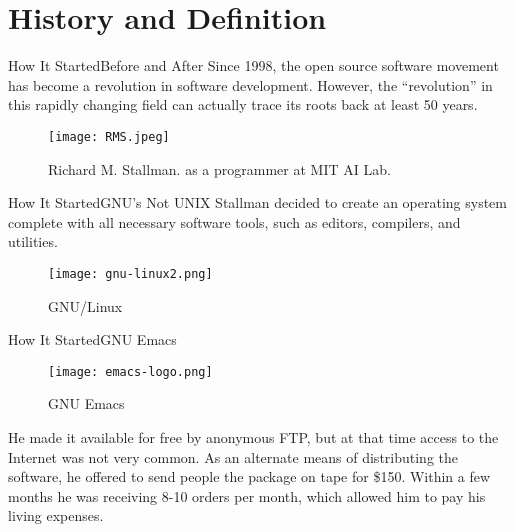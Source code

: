 \documentclass{beamer}
\begin{document}
    \section{History and Definition}
    \begin{frame}{How It Started}{Before and After}
        Since 1998, the open source software movement has become a revolution in software development.
        However, the “revolution” in this rapidly changing field can actually trace its roots back at least 50 years.\cite{bretthauer2001open}
        \begin{figure}
            \centering
                \texttt{[image: RMS.jpeg]}
                \caption{Richard M. Stallman. as a programmer at MIT AI Lab.\cite{GNUDOTORG:2}}
        \end{figure}
    \end{frame}

    \begin{frame}{How It Started}{GNU's Not UNIX}
        Stallman decided to create an operating system complete with all necessary software tools, such as
        editors, compilers, and utilities.\cite{bretthauer2001open}
        \begin{figure}
            \centering
                \texttt{[image: gnu-linux2.png]}
                \caption{GNU/Linux \cite{pngegg}}
        \end{figure}

    \end{frame}

    \begin{frame}{How It Started}{GNU Emacs}
        \begin{figure}
            \centering
                \texttt{[image: emacs-logo.png]}
                \caption{GNU Emacs\cite{GNUDOTORG:2}}
        \end{figure}
        He made it available for free by anonymous FTP, but at that time access to the
        Internet was not very common. As an alternate means of distributing the software, he offered to send people
        the package on tape for \$150. Within a few months he was receiving 8-10 orders per month, which allowed
        him to pay his living expenses.\cite{bretthauer2001open}
    \end{frame}
\end{document}
